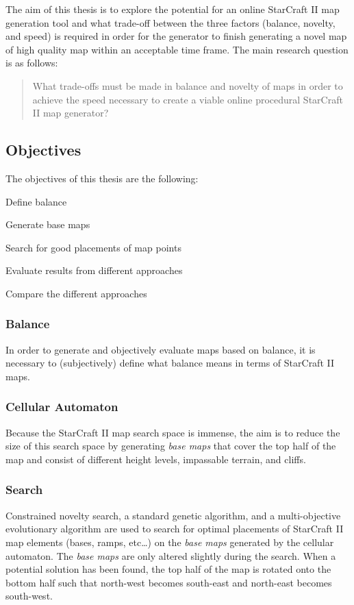 The aim of this thesis is to explore the potential for an online StarCraft II map generation tool and what trade-off between the three factors (balance, novelty, and speed) is required in order for the generator to finish generating a novel map of high quality map within an acceptable time frame. The main research question is as follows:
\begin{quote}
What trade-offs must be made in balance and novelty of maps in order to achieve the speed necessary to create a viable online procedural StarCraft II map generator?
\end{quote}

\subsection{Objectives}
\label{introduction_starcraft_objectives}
The objectives of this thesis are the following:
\begin{my_enumerate}
\item Define balance
\item Generate base maps
\item Search for good placements of map points
\item Evaluate results from different approaches
\item Compare the different approaches
\end{my_enumerate}

\subsubsection{Balance}
In order to generate and objectively evaluate maps based on balance, it is necessary to (subjectively) define what balance means in terms of StarCraft II maps.
\subsubsection{Cellular Automaton}
Because the StarCraft II map search space is immense, the aim is to reduce the size of this search space by generating \textit{base maps} that cover the top half of the map and consist of different height levels, impassable terrain, and cliffs. 
\subsubsection{Search}
Constrained novelty search, a standard genetic algorithm, and a multi-objective evolutionary algorithm are used to search for optimal placements of StarCraft II map elements (bases, ramps, etc\ldots) on the \textit{base maps} generated by the cellular automaton. The \textit{base maps} are only altered slightly during the search. When a potential solution has been found, the top half of the map is rotated onto the bottom half such that north-west becomes south-east and north-east becomes south-west.
